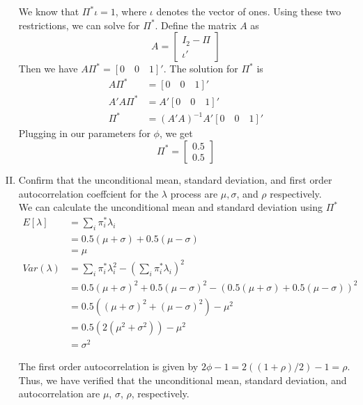 \documentclass[french]{article}
\begin{document}
\begin{enumerate}[I.]
	We know that $\Pi^*\iota = 1$, where $\iota$ denotes the vector of ones. Using these two restrictions, we can solve for $\Pi^*$. Define the matrix $A$ as 
	\begin{equation*}
		A = \begin{bmatrix}
		I_2 - \Pi \\ \iota'
		\end{bmatrix}
	\end{equation*}
	Then we have $A\Pi^* = \left[0\quad0\quad 1\right]'$. The solution for $\Pi^*$ is 
	\begin{equation*}
	\begin{split}
	A\Pi^* &= \left[0\quad0\quad 1\right]'\\
	A'A\Pi^* &= A'\left[0\quad0\quad 1\right]'\\
	\Pi^* &= (A'A)^{-1}A'\left[0 \quad 0 \quad 1\right]'
	\end{split}
	\end{equation*}
	Plugging in our parameters for $\phi$, we get 
	\begin{equation*}
		\Pi^* =	
		\begin{bmatrix}
		0.5\\ 0.5
		\end{bmatrix}
	\end{equation*}
	\item Confirm that the unconditional mean, standard deviation, and first order autocorrelation coeffcient for the $\lambda$ process are $\mu, \sigma$, and $\rho$ respectively. \\
	
	We can calculate the unconditional mean and standard deviation using $\Pi^*$
	\begin{equation*}
		\begin{split}
		E\left[\lambda\right] &= \sum_i \pi_{i}^*\lambda_i\\
		&= 0.5 (\mu+\sigma) + 0.5(\mu -\sigma)\\
		&= \mu\\
		Var(\lambda)&= \sum_i \pi_{i}^* \lambda_i^2 - \left(\sum_i \pi_{i}^*\lambda_i\right)^2\\
		&=0.5 (\mu+\sigma)^2 + 0.5(\mu -\sigma)^2 - (0.5 (\mu+\sigma) + 0.5(\mu -\sigma))^2\\
		&= 0.5( (\mu+\sigma)^2 +(\mu -\sigma)^2) - \mu^2\\
		&=  0.5( 2(\mu^2+\sigma^2)) - \mu^2\\
		& = \sigma^2
		\end{split}
	\end{equation*}
	
	The first order autocorrelation is given by $2\phi -1 = 2((1+\rho)/2)-1 = \rho$. 
	Thus, we have verified that the unconditional mean, standard deviation, and autocorrelation are $\mu$, $\sigma$, $\rho$,  respectively.
\end{enumerate}
\end{document}
